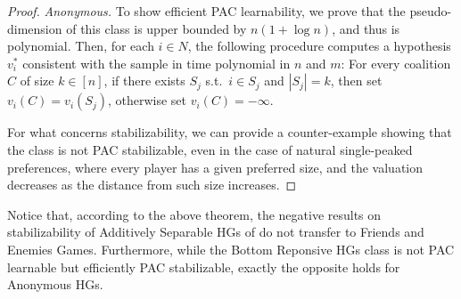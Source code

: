 \documentclass[letterpaper]{article} %
\makeatletter
\newcommand{\proofpart}[1]{%
  \par
  \addvspace{\smallskipamount}%
  \noindent\emph{#1} \hspace{2pt}
}
\makeatother
\begin{document}
\begin{proof}
\proofpart{Anonymous.}To show efficient PAC learnability, we prove that the pseudo-dimension of this class is upper bounded by $n (1+\log n)$, and thus is polynomial. Then, for each $i \in N$, the following procedure computes a hypothesis $v_i^*$ consistent with the sample in time polynomial in $n$ and $m$: For every coalition $C$ of size $k\in[n]$, if there exists $S_j$ s.t.\ $i\in S_j$ and $|S_j|=k$, then set $v_i(C)=v_i(S_j)$, otherwise set $v_i(C)=-\infty$.

For what concerns stabilizability, we can provide a counter-example showing that the class is not PAC stabilizable, even in the case of natural single-peaked preferences, where every player has a given preferred size, and the valuation decreases as the distance from such size increases.
\end{proof}

Notice that, according to the above theorem, the negative results on stabilizability of Additively Separable HGs of \cite{SliwinskiZ17} do not transfer to Friends and Enemies Games.
Furthermore, while the Bottom Reponsive HGs class is not PAC learnable but efficiently PAC stabilizable, exactly the opposite holds for Anonymous HGs. 
\end{document}
